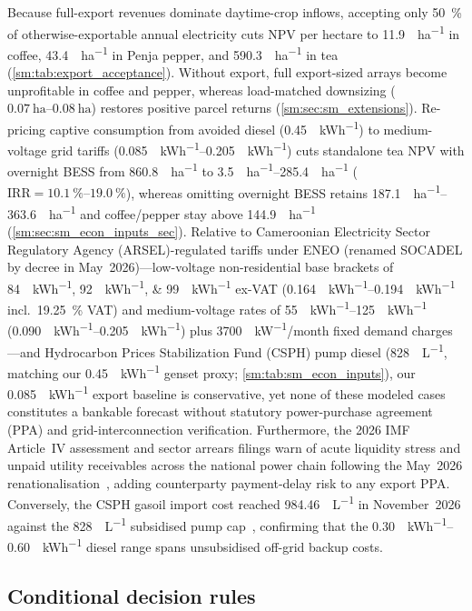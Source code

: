 \documentclass[preprint,12pt,a4paper]{elsarticle}
\begin{document}
Because full-export revenues dominate daytime-crop inflows, accepting only \qty{50}{\percent} of otherwise-exportable annual electricity cuts NPV per hectare to \qty{11.9}{\kUSD\per\hectare} in coffee, \qty{43.4}{\kUSD\per\hectare} in Penja pepper, and \qty{590.3}{\kUSD\per\hectare} in tea (\cref{sm:tab:export_acceptance}). Without export, full export-sized arrays become unprofitable in coffee and pepper, whereas load-matched downsizing ($\qtyrange{0.07}{0.08}{\hectare}$) restores positive parcel returns (\cref{sm:sec:sm_extensions}). Re-pricing captive consumption from avoided diesel (\qty{0.45}{\USD\per\kWh}) to medium-voltage grid tariffs (\qtyrange{0.085}{0.205}{\USD\per\kWh}) cuts standalone tea NPV with overnight BESS from \qty{860.8}{\kUSD\per\hectare} to \qtyrange{3.5}{285.4}{\kUSD\per\hectare} ($\mathrm{IRR}=\qtyrange{10.1}{19.0}{\percent}$), whereas omitting overnight BESS retains \qtyrange{187.1}{363.6}{\kUSD\per\hectare} and coffee/pepper stay above \qty{144.9}{\kUSD\per\hectare} (\cref{sm:sec:sm_econ_inputs_sec}). Relative to Cameroonian Electricity Sector Regulatory Agency (ARSEL)-regulated tariffs under ENEO (renamed SOCADEL by decree in May~2026)---low-voltage non-residential base brackets of \qtylist{84;92;99}{\XAF\per\kWh} ex-VAT (\qtyrange{0.164}{0.194}{\USD\per\kWh} incl.\ \qty{19.25}{\percent} VAT) and medium-voltage rates of \qtyrange{55}{125}{\XAF\per\kWh} (\qtyrange{0.090}{0.205}{\USD\per\kWh}) plus \qty{3700}{\XAF\per\kW}/month fixed demand charges---and Hydrocarbon Prices Stabilization Fund (CSPH) pump diesel (\qty{828}{\XAF\per\liter}, matching our \qty{0.45}{\USD\per\kWh} genset proxy; \cref{sm:tab:sm_econ_inputs}), our \qty{0.085}{\USD\per\kWh} export baseline is conservative, yet none of these modeled cases constitutes a bankable forecast without statutory power-purchase agreement (PPA) and grid-interconnection verification. Furthermore, the 2026 IMF Article~IV assessment and sector arrears filings warn of acute liquidity stress and unpaid utility receivables across the national power chain following the May~2026 renationalisation~\cite{IMF2026Cameroon}, adding counterparty payment-delay risk to any export PPA. Conversely, the CSPH gasoil import cost reached \qty{984.46}{\XAF\per\liter} in November~2026 against the \qty{828}{\XAF\per\liter} subsidised pump cap~\cite{CSPH2026Diesel}, confirming that the \qtyrange{0.30}{0.60}{\USD\per\kWh} diesel range spans unsubsidised off-grid backup costs.

\subsection{Conditional decision rules}
\label{sec:decision_map}
\end{document}
